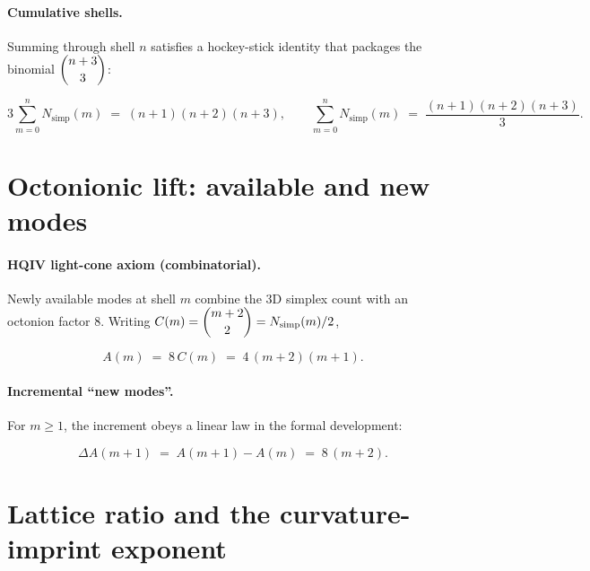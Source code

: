 \documentclass[11pt,a4paper]{article}
\theoremstyle{remark}
\begin{document}
\paragraph{Cumulative shells.}
Summing through shell $n$ satisfies a hockey-stick identity that packages the binomial $\dbinom{n+3}{3}$:

\begin{equation}
  3\sum_{m=0}^{n} N_{\mathrm{simp}}(m) \;=\; (n+1)(n+2)(n+3),
  \qquad
  \sum_{m=0}^{n} N_{\mathrm{simp}}(m) \;=\; \frac{(n+1)(n+2)(n+3)}{3}.
\end{equation}

\section{Octonionic lift: available and new modes}

\paragraph{HQIV light-cone axiom (combinatorial).}
Newly available modes at shell $m$ combine the $3$D simplex count with an octonion factor $8$. Writing $C(m)=\dbinom{m+2}{2}=N_{\mathrm{simp}}(m)/2$,

\begin{equation}
  A(m) \;=\; 8\,C(m) \;=\; 4\,(m+2)(m+1).
\end{equation}

\paragraph{Incremental ``new modes''.}
For $m\ge 1$, the increment obeys a linear law in the formal development:

\begin{equation}
  \Delta A(m+1) \;=\; A(m+1)-A(m) \;=\; 8\,(m+2).
\end{equation}

\section{Lattice ratio and the curvature-imprint exponent}
\end{document}
